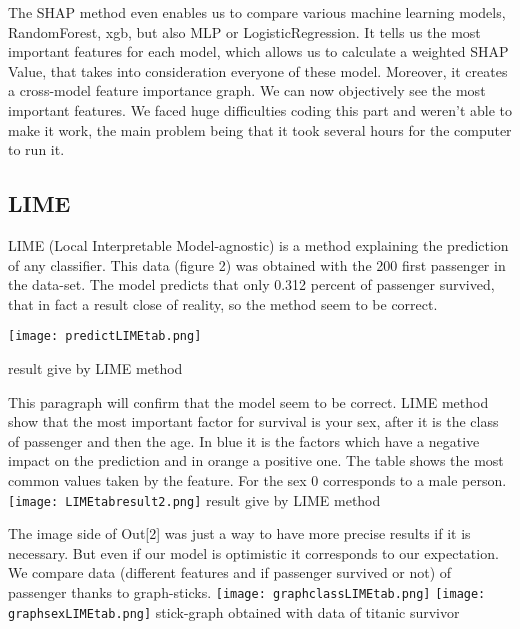 \documentclass[sigplan,screen]{acmart}
\begin{document}
The SHAP method even enables us to compare various machine learning models, RandomForest, xgb, but also MLP or LogisticRegression. It tells us the most important features for each model, which allows us to calculate a weighted SHAP Value, that takes into consideration everyone of these model. Moreover, it creates a cross-model feature importance graph. We can now objectively see the most important features.
We faced huge difficulties coding this part and weren't able to make it work, the main problem being that it took several hours for the computer to run it. 
\subsection{LIME}
\Large
LIME (Local Interpretable Model-agnostic) is a method explaining the prediction of any classifier.
This data (figure 2) was obtained with the 200 first passenger in the data-set.
The model predicts that only 0.312 percent of passenger survived, that in fact a result close of reality, so the method seem to be correct. 
\newline
    
    \centering
        \texttt{[image: predictLIMEtab.png]}
        
        \small result give by LIME method
        \newline

   
\Large
This paragraph will confirm that the model seem to be correct. LIME method show that the most important factor for survival is your sex, after it is the class of passenger and then the age. In blue it is the factors which have a negative impact on the prediction and in orange a positive one. The table shows the most common values taken by the feature. For the sex 0 corresponds to a male person.
\newline
    \centering
        \texttt{[image: LIMEtabresult2.png]}
        \small result give by LIME method
        \newline

\Large
The image side of Out[2] was just a way to have more precise results if it is necessary.
But even if our model is optimistic it corresponds to our expectation. We compare data (different features and if passenger survived or not) of passenger thanks to graph-sticks.
    \newline
    \centering
        \texttt{[image: graphclassLIMEtab.png]}
        \texttt{[image: graphsexLIMEtab.png]}
        \small stick-graph obtained with data of titanic survivor
        \newline
        
\end{document}
